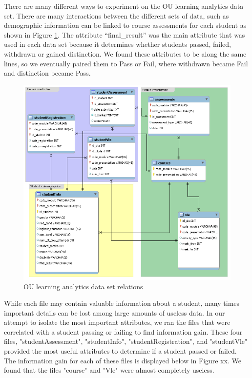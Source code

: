 \documentclass[12pt]{article}
\begin{document}
There are many different ways to experiment on the OU learning analytics data set. There are many interactions between the different sets of data, such as demographic
information can be linked to course assessments for each student as shown in Figure \ref{fig:db_model}. The attribute ``final\_result'' was the main attribute that was used in each data set because it determines whether students passed, failed, withdrawn or gained distinction. We found these attributes to be along the same lines, so we eventually paired them to Pass or Fail, where withdrawn became Fail and distinction became Pass.

 \begin{figure}[h]
 \centering
 \includegraphics[scale=0.5]{db_model.png}
 \caption{OU learning analytics data set relations \cite{oulad}}
 \label{fig:db_model}
 \end{figure}
 
 \newpage
 While each file may contain valuable information about a student, many times important details can be lost among large amounts of useless data. In our attempt to isolate the most important attributes, we ran the files that were correlated with a student passing or failing to find information gain. These four files, "studentAssessment", "studentInfo", "studentRegistration", and "studentVle" provided the most useful attributes to determine if a student passed or failed. The information gain for each of these files is displayed below in Figure xx. We found that the files "course" and "Vle" were almost completely useless. 
\end{document}
